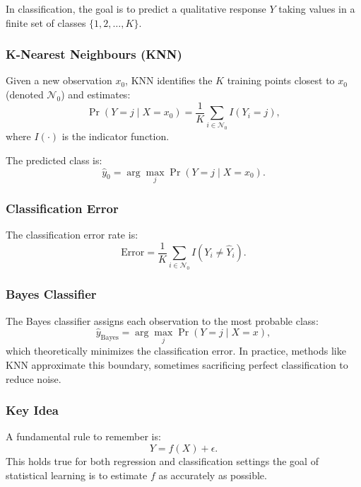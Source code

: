 In classification, the goal is to predict a qualitative response \( Y \) taking values in a finite set of classes \( \{1, 2, \ldots, K\} \).

\subsubsection{K-Nearest Neighbours (KNN)}
Given a new observation \( x_0 \), KNN identifies the \( K \) training points closest to \( x_0 \) (denoted \( \mathcal{N}_0 \)) and estimates:
\[
\Pr(Y = j \mid X = x_0) = \frac{1}{K} \sum_{i \in \mathcal{N}_0} I(Y_i = j),
\]
where \( I(\cdot) \) is the indicator function.

The predicted class is:
\[
\hat{y}_0 = \arg\max_j \Pr(Y = j \mid X = x_0).
\]

\subsubsection{Classification Error}
The classification error rate is:
\[
\text{Error} = \frac{1}{K} \sum_{i \in \mathcal{N}_0} I(Y_i \neq \hat{Y}_i).
\]

\subsubsection{Bayes Classifier}
The Bayes classifier assigns each observation to the most probable class:
\[
\hat{y}_{\text{Bayes}} = \arg\max_j \Pr(Y = j \mid X = x),
\]
which theoretically minimizes the classification error.  
In practice, methods like KNN approximate this boundary, sometimes sacrificing perfect classification to reduce noise.

\subsubsection{Key Idea}
A fundamental rule to remember is:
\[
Y = f(X) + \epsilon.
\]
This holds true for both regression and classification settings the goal of statistical learning is to estimate \( f \) as accurately as possible.

 
